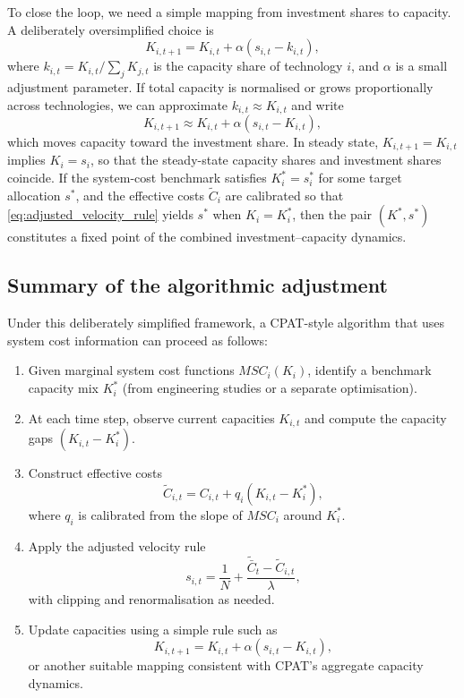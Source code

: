 \documentclass[preprint,authoryear,12pt]{elsarticle}
\begin{document}
To close the loop, we need a simple mapping from investment shares to capacity. A deliberately
oversimplified choice is
\begin{equation}
    K_{i,t+1}
    = K_{i,t} + \alpha (s_{i,t} - k_{i,t}),
    \label{eq:capacity_update_rule}
\end{equation}
where $k_{i,t} = K_{i,t} / \sum_j K_{j,t}$ is the capacity share of technology $i$, and $\alpha$ is a
small adjustment parameter. If total capacity is normalised or grows proportionally across
technologies, we can approximate $k_{i,t} \approx K_{i,t}$ and write
\[
    K_{i,t+1} \approx K_{i,t} + \alpha (s_{i,t} - K_{i,t}),
\]
which moves capacity toward the investment share. In steady state, $K_{i,t+1} = K_{i,t}$ implies
$K_i = s_i$, so that the steady-state capacity shares and investment shares coincide. If the
system-cost benchmark satisfies $K_i^* = s_i^*$ for some target allocation $s^*$, and the
effective costs $\tilde{C}_i$ are calibrated so that \eqref{eq:adjusted_velocity_rule} yields
$s^*$ when $K_i = K_i^*$, then the pair $(K^*, s^*)$ constitutes a fixed point of the combined
investment–capacity dynamics.

\subsection*{Summary of the algorithmic adjustment}

Under this deliberately simplified framework, a CPAT-style algorithm that uses system cost
information can proceed as follows:

\begin{enumerate}
    \item Given marginal system cost functions $MSC_i(K_i)$, identify a benchmark capacity mix
          $K_i^*$ (from engineering studies or a separate optimisation).
    \item At each time step, observe current capacities $K_{i,t}$ and compute the capacity gaps
          $(K_{i,t} - K_i^*)$.
    \item Construct effective costs
          \[
              \tilde{C}_{i,t}
              = C_{i,t} + q_i (K_{i,t} - K_i^*),
          \]
          where $q_i$ is calibrated from the slope of $MSC_i$ around $K_i^*$.
    \item Apply the adjusted velocity rule
          \[
              s_{i,t}
              = \frac{1}{N}
                + \frac{\tilde{\bar{C}}_t - \tilde{C}_{i,t}}{\lambda},
          \]
          with clipping and renormalisation as needed.
    \item Update capacities using a simple rule such as
          \[
              K_{i,t+1} = K_{i,t} + \alpha (s_{i,t} - K_{i,t}),
          \]
          or another suitable mapping consistent with CPAT’s aggregate capacity dynamics.
\end{enumerate}
\end{document}
